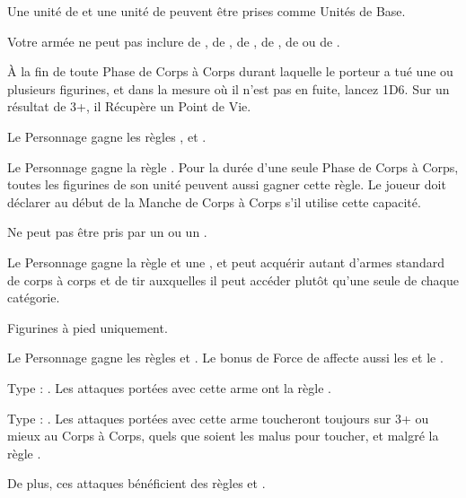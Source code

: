 \begin{multicols}{2}
Une unité de \yetis{} et une unité de \sabretoothtigers{} peuvent être prises comme Unités de Base.

Votre armée ne peut pas inclure de \greatkhan{}, de \khan{}, de \bruiser{}, de \mercenaryveteran{}, de \bombardier{} ou de \thundercannon{}.

À la fin de toute Phase de Corps à Corps durant laquelle le porteur a tué une ou plusieurs figurines, et dans la mesure où il n'est pas en fuite, lancez 1D6. Sur un résultat de 3+, il Récupère un Point de Vie.

Le Personnage gagne les règles , \stupidity{} et .

Le Personnage gagne la règle \poisonedattacks{}. Pour la durée d'une seule Phase de Corps à Corps, toutes les figurines de son unité peuvent aussi gagner cette règle. Le joueur doit déclarer au début de la Manche de Corps à Corps s'il utilise cette capacité.

Ne peut pas être pris par un \wizard{} ou un \mammothhunter{}.

Le Personnage gagne la règle \weaponmaster{} et une \platearmour{}, et peut acquérir autant d'armes standard de corps à corps et de tir auxquelles il peut accéder plutôt qu'une seule de chaque catégorie.

Figurines à pied uniquement.

Le Personnage gagne les règles \devastatingcharge{} et \thunderouscharge{}. Le bonus de Force de \thunderouscharge{} affecte aussi les \impacthits{} et le \stomp{}.

\endpricelistNSP
\end{multicols}

\closearmynewsection

\startarmymagicalitems

\armymagicalweapons

\startpricelist

Type : \gw{}. Les attaques portées avec cette arme ont la règle .

Type : \ironfist{}. Les attaques portées avec cette arme toucheront toujours sur 3+ ou mieux au Corps à Corps, quels que soient les malus pour toucher, et malgré la règle \parry{}.

De plus, ces attaques bénéficient des règles  et .

